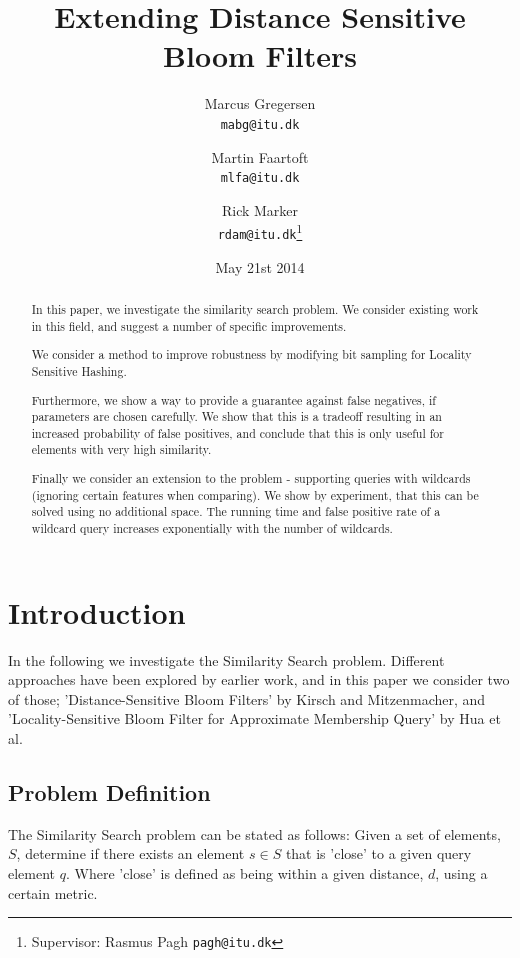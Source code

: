 \documentclass[a4paper,11pt]{article}
\begin{document}
\graphicspath{ {./images/} }
\date{May 21st 2014}
\title{Extending Distance Sensitive Bloom Filters}

\author{Marcus Gregersen\\
\texttt{mabg@itu.dk}
\and Martin Faartoft\\
\texttt{mlfa@itu.dk}
\and Rick Marker\\
\texttt{rdam@itu.dk}\thanks{Supervisor: Rasmus Pagh \texttt{pagh@itu.dk}}}
\clearpage\maketitle
\thispagestyle{empty}
\setcounter{page}{1}
\begin{abstract}
In this paper, we investigate the similarity search problem. We consider existing work in this field, and suggest a number of specific improvements.

We consider a method to improve robustness by modifying bit sampling for Locality Sensitive Hashing.

Furthermore, we show a way to provide a guarantee against false negatives, if parameters are chosen carefully. We show that this is a tradeoff resulting in an increased probability of false positives, and conclude that this is only useful for elements with very high similarity.

Finally we consider an extension to the problem - supporting queries with wildcards (ignoring certain features when comparing). We show by experiment, that this can be solved using no additional space. The running time and false positive rate of a wildcard query increases exponentially with the number of wildcards.
\end{abstract}


\section{Introduction}
In the following we investigate the Similarity Search problem. Different approaches have been explored by earlier work, and in this paper we consider two of those; 'Distance-Sensitive Bloom Filters'\cite{paper:harvard} by Kirsch and Mitzenmacher, and 'Locality-Sensitive Bloom Filter for Approximate Membership Query'\cite{paper:hua} by Hua et al.

\subsection{Problem Definition}
The Similarity Search problem can be stated as follows: Given a set of elements, $S$, determine if there exists an element $s \in S$ that is 'close' to a given query element $q$. Where 'close' is defined as being within a given distance, $d$, using a certain metric.
\end{document}
